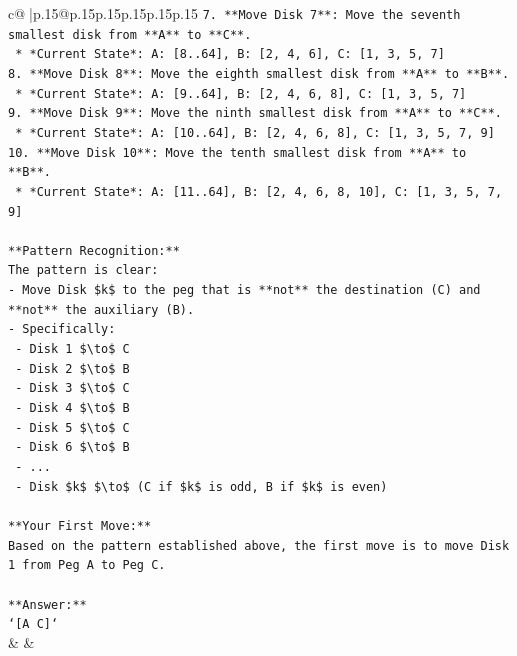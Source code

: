\documentclass{article}
\begin{document}
{\begin{supertabular}{c@{$\;$}|p{.15\linewidth}@{}p{.15\linewidth}p{.15\linewidth}p{.15\linewidth}p{.15\linewidth}p{.15\linewidth}}
{{{\texttt{7.  **Move Disk 7**: Move the seventh smallest disk from **A** to **C**.} \\
\texttt{    *   *Current State*: A: {[}8..64{]}, B: {[}2, 4, 6{]}, C: {[}1, 3, 5, 7{]}} \\
\texttt{8.  **Move Disk 8**: Move the eighth smallest disk from **A** to **B**.} \\
\texttt{    *   *Current State*: A: {[}9..64{]}, B: {[}2, 4, 6, 8{]}, C: {[}1, 3, 5, 7{]}} \\
\texttt{9.  **Move Disk 9**: Move the ninth smallest disk from **A** to **C**.} \\
\texttt{    *   *Current State*: A: {[}10..64{]}, B: {[}2, 4, 6, 8{]}, C: {[}1, 3, 5, 7, 9{]}} \\
\texttt{10. **Move Disk 10**: Move the tenth smallest disk from **A** to **B**.} \\
\texttt{    *   *Current State*: A: {[}11..64{]}, B: {[}2, 4, 6, 8, 10{]}, C: {[}1, 3, 5, 7, 9{]}} \\
\\ 
\texttt{**Pattern Recognition:**} \\
\texttt{The pattern is clear:} \\
\texttt{{-} Move Disk \$k\$ to the peg that is **not** the destination (C) and **not** the auxiliary (B).} \\
\texttt{{-} Specifically:} \\
\texttt{    {-} Disk 1 \$\textbackslash{}to\$ C} \\
\texttt{    {-} Disk 2 \$\textbackslash{}to\$ B} \\
\texttt{    {-} Disk 3 \$\textbackslash{}to\$ C} \\
\texttt{    {-} Disk 4 \$\textbackslash{}to\$ B} \\
\texttt{    {-} Disk 5 \$\textbackslash{}to\$ C} \\
\texttt{    {-} Disk 6 \$\textbackslash{}to\$ B} \\
\texttt{    {-} ...} \\
\texttt{    {-} Disk \$k\$ \$\textbackslash{}to\$ (C if \$k\$ is odd, B if \$k\$ is even)} \\
\\ 
\texttt{**Your First Move:**} \\
\texttt{Based on the pattern established above, the first move is to move Disk 1 from Peg A to Peg C.} \\
\\ 
\texttt{**Answer:**} \\
\texttt{`{[}A C{]}`} \\
            }
        }
    }
    & & \\ \\


\end{supertabular}}
\end{document}
